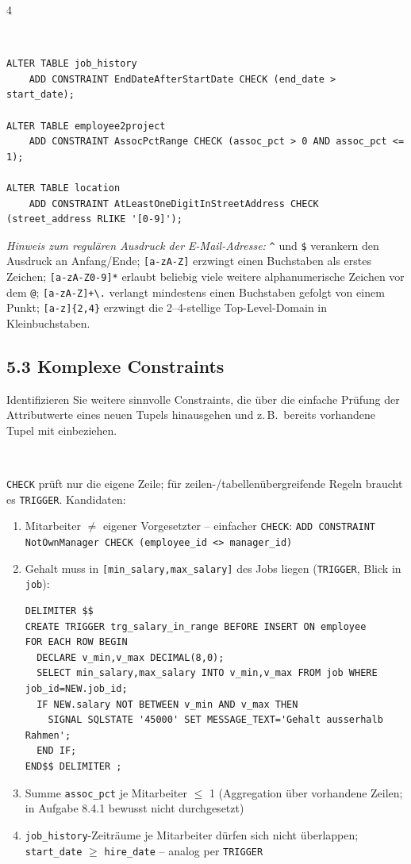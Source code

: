 \documentclass[8pt,a4paper]{extarticle}
\newenvironment{loesung}[1][]{%
    \par\noindent{\bfseries\color{loesungrahmen}\small$\blacktriangleright$~L\"osung#1:}~%
}{\par\smallskip}
\begin{document}
\begin{multicols}{4}
\begin{loesung}[ (5.1 \& 5.2)]
\begin{lstlisting}
ALTER TABLE job_history
    ADD CONSTRAINT EndDateAfterStartDate CHECK (end_date > start_date);

ALTER TABLE employee2project
    ADD CONSTRAINT AssocPctRange CHECK (assoc_pct > 0 AND assoc_pct <= 1);

ALTER TABLE location
    ADD CONSTRAINT AtLeastOneDigitInStreetAddress CHECK (street_address RLIKE '[0-9]');
\end{lstlisting}
\emph{Hinweis zum regul\"aren Ausdruck der E-Mail-Adresse:} \texttt{\^{}} und \texttt{\$} verankern den Ausdruck an Anfang/Ende; \texttt{[a-zA-Z]} erzwingt einen Buchstaben als erstes Zeichen; \texttt{[a-zA-Z0-9]*} erlaubt beliebig viele weitere alphanumerische Zeichen vor dem \texttt{@}; \texttt{[a-zA-Z]+\textbackslash.} verlangt mindestens einen Buchstaben gefolgt von einem Punkt; \texttt{[a-z]\{2,4\}} erzwingt die 2--4-stellige Top-Level-Domain in Kleinbuchstaben.
\end{loesung}

\subsection*{5.3 \quad Komplexe Constraints}
Identifizieren Sie weitere sinnvolle Constraints, die \"uber die einfache Pr\"ufung der Attributwerte eines neuen Tupels hinausgehen und z.\,B.\ bereits vorhandene Tupel mit einbeziehen.

\begin{loesung}
\texttt{CHECK} pr\"uft nur die eigene Zeile; f\"ur zeilen-/tabellen\"ubergreifende Regeln braucht es \texttt{TRIGGER}. Kandidaten:
\begin{enumerate}
\item Mitarbeiter $\ne$ eigener Vorgesetzter -- einfacher \texttt{CHECK}: \texttt{ADD CONSTRAINT NotOwnManager CHECK (employee\_id <> manager\_id)}
\item Gehalt muss in \texttt{[min\_salary,max\_salary]} des Jobs liegen (\texttt{TRIGGER}, Blick in \texttt{job}):
\begin{lstlisting}
DELIMITER $$
CREATE TRIGGER trg_salary_in_range BEFORE INSERT ON employee
FOR EACH ROW BEGIN
  DECLARE v_min,v_max DECIMAL(8,0);
  SELECT min_salary,max_salary INTO v_min,v_max FROM job WHERE job_id=NEW.job_id;
  IF NEW.salary NOT BETWEEN v_min AND v_max THEN
    SIGNAL SQLSTATE '45000' SET MESSAGE_TEXT='Gehalt ausserhalb Rahmen';
  END IF;
END$$ DELIMITER ;
\end{lstlisting}
\item Summe \texttt{assoc\_pct} je Mitarbeiter $\le$ 1 (Aggregation \"uber vorhandene Zeilen; in Aufgabe 8.4.1 bewusst nicht durchgesetzt)
\item \texttt{job\_history}-Zeitr\"aume je Mitarbeiter d\"urfen sich nicht \"uberlappen; \texttt{start\_date} $\ge$ \texttt{hire\_date} -- analog per \texttt{TRIGGER}
\end{enumerate}
\end{loesung}



\end{multicols}
\end{document}
